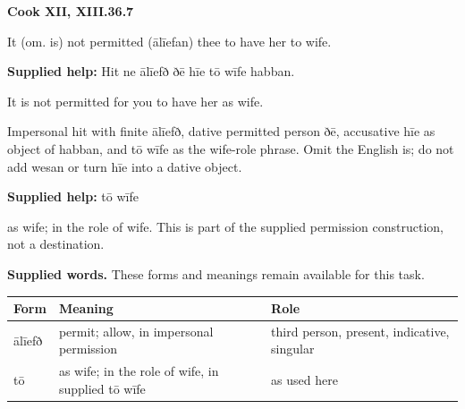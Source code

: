 \par\begin{minipage}{\linewidth}\raggedright
\textbf{Cook XII, XIII.36.7}

It (om. is) not permitted (ālīefan) thee to have her to wife.

\textbf{Supplied help:} Hit ne ālīefð ðē hīe tō wīfe habban.

It is not permitted for you to have her as wife.

Impersonal hit with finite ālīefð, dative permitted person ðē, accusative hīe as object of habban, and tō wīfe as the wife-role phrase. Omit the English is; do not add wesan or turn hīe into a dative object.

\textbf{Supplied help:} tō wīfe

as wife; in the role of wife. This is part of the supplied permission construction, not a destination.

\textbf{Supplied words.} These forms and meanings remain available for this task.

\par\begingroup
\fontsize{10.5}{13.2}\selectfont
\setlength{\LTleft}{0pt}\setlength{\LTright}{\fill}
\noindent
\begin{tabular}{@{}>{\raggedright\arraybackslash}p{18.8mm}>{\raggedright\arraybackslash}p{51.81mm}>{\raggedright\arraybackslash}p{47.76mm}@{}}
\toprule
\textbf{Form} & \textbf{Meaning} & \textbf{Role} \\
\midrule
ālīefð & permit; allow, in impersonal permission & third person, present, indicative, singular \\
tō & as wife; in the role of wife, in supplied tō wīfe & as used here \\
\bottomrule
\end{tabular}
\par\endgroup

\end{minipage}\par\addvspace{4pt}

